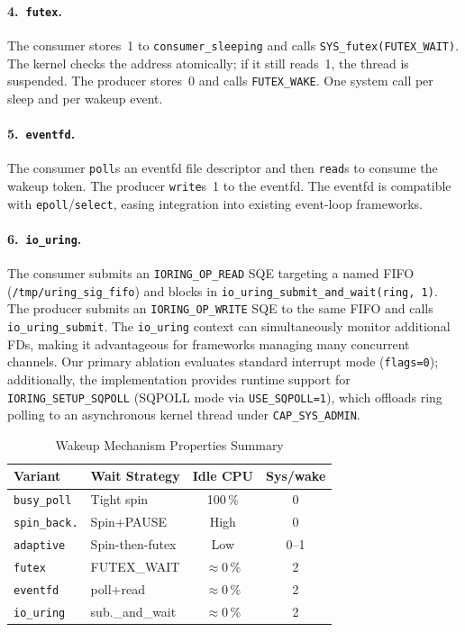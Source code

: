 \documentclass[10pt,conference]{IEEEtran}
\begin{document}
\paragraph{4.~\texttt{futex}.}
The consumer stores~1 to \texttt{consumer\-\_sleeping} and calls
\texttt{SYS\-\_futex(FUTEX\-\_WAIT)}.  The kernel checks the address
atomically; if it still reads~1, the thread is suspended.  The producer
stores~0 and calls \texttt{FUTEX\-\_WAKE}.  One system call per sleep
and per wakeup event.

\paragraph{5.~\texttt{eventfd}.}
The consumer \texttt{poll}s an eventfd file descriptor and then \texttt{read}s
to consume the wakeup token.  The producer \texttt{write}s~1 to the eventfd.
The eventfd is compatible with \texttt{epoll}/\texttt{select}, easing
integration into existing event-loop frameworks.

\paragraph{6.~\texttt{io\_uring}.}
The consumer submits an \texttt{IORING\-\_OP\-\_READ} SQE targeting a
named FIFO (\texttt{/tmp/\allowbreak uring\-\_sig\-\_fifo}) and blocks
in \texttt{io\-\_uring\-\_submit\-\_and\-\_wait\-(ring,~1)}.  The
producer submits an \texttt{IORING\-\_OP\-\_WRITE} SQE to the same FIFO
and calls \texttt{io\-\_uring\-\_submit}.  The \texttt{io\-\_uring}
context can simultaneously monitor additional FDs, making it advantageous
for frameworks managing many concurrent channels.  Our primary ablation evaluates
standard interrupt mode (\texttt{flags=0}); additionally, the implementation provides
runtime support for \texttt{IORING\_SETUP\_SQPOLL} (SQPOLL mode via \texttt{USE\_SQPOLL=1}),
which offloads ring polling to an asynchronous kernel thread under \texttt{CAP\_SYS\_ADMIN}.

\begin{table}[H]
  \centering
  \caption{Wakeup Mechanism Properties Summary}
  \label{tab:wakeup}
  \small
  \begin{tabular}{@{}L{1.8cm}lcc@{}}
    \toprule
    \textbf{Variant} & \textbf{Wait Strategy} & \textbf{Idle CPU} & \textbf{Sys/wake}\\
    \midrule
    \texttt{busy\_poll}    & Tight spin         & 100\,\%        & 0   \\
    \texttt{spin\_back.}   & Spin+PAUSE         & High           & 0   \\
    \texttt{adaptive}      & Spin-then-futex    & Low            & 0--1 \\
    \texttt{futex}         & FUTEX\_WAIT        & {$\approx$}0\,\% & 2 \\
    \texttt{eventfd}       & poll+read          & {$\approx$}0\,\% & 2 \\
    \texttt{io\_uring}     & sub.\_and\_wait    & {$\approx$}0\,\% & 2 \\
    \bottomrule
  \end{tabular}
\end{table}
\end{document}
